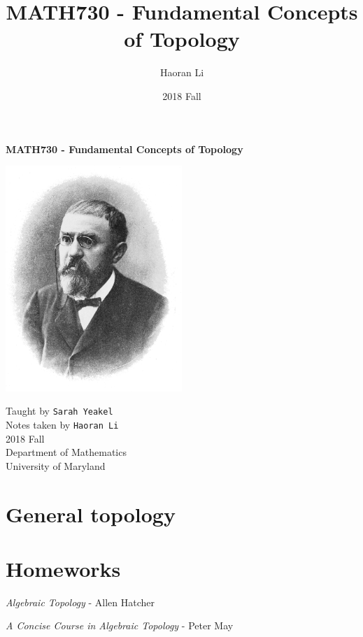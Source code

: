 \documentclass[a4paper,10pt]{article}
\title{MATH730 - Fundamental Concepts of Topology}
\author{Haoran Li}
\date{2018 Fall}
\begin{document}
\sloppy %

\begin{titlepage}
\begin{center}
\vspace*{1cm}
\Huge
\textbf{MATH730 - Fundamental Concepts of Topology} \\
\vspace{2cm}
\begin{center}
\includegraphics[width=0.5\textwidth]{Pictures/Henri_Poincare.png}
\end{center}
\vspace{2cm}
\normalsize
Taught by \texttt{Sarah Yeakel} \\
Notes taken by \texttt{Haoran Li} \\
2018 Fall \\
\vspace{2cm}
Department of Mathematics\\
University of Maryland\\
\end{center}
\end{titlepage}

\tableofcontents
\newpage

\section{General topology}

\newpage

\section{Homeworks}

\newpage

\begin{thebibliography}{}

\textit{Algebraic Topology} - Allen Hatcher

\textit{A Concise Course in Algebraic Topology} - Peter May

\end{thebibliography}

\printindex
\newpage
\end{document}
